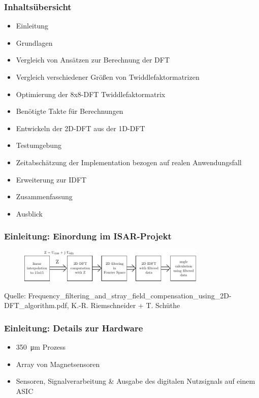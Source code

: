 \begin{frame}\frametitle{Inhaltsübersicht}
\begin{itemize}
 \item Einleitung
 \item Grundlagen
 \item Vergleich von Ansätzen zur Berechnung der DFT
 \item Vergleich verschiedener Größen von Twiddlefaktormatrizen
 \item Optimierung der 8x8-DFT Twiddlefaktormatrix
 \item Benötigte Takte für Berechnungen
 \item Entwickeln der 2D-DFT aus der 1D-DFT
 \item Testumgebung
 \item Zeitabschätzung der Implementation bezogen auf realen Anwendungsfall
 \item Erweiterung zur IDFT
 \item Zusammenfassung
 \item Ausblick
\end{itemize}
\end{frame}



\begin{frame}\frametitle{Einleitung: Einordung im ISAR-Projekt}
\vspace{1cm}
 \begin{figure}[ht!]
 \centering
 \includegraphics[width=0.8\textwidth]{img/AblaufFourier.pdf}
 \label{pic:AblaufFourier}
\end{figure}
\vspace{2cm}
\begin{center}
 \tiny{Quelle: Frequency\_filtering\_and\_stray\_field\_compensation\_using\_2D-DFT\_algorithm.pdf, K.-R. Riemschneider + T. Schüthe}
\end{center}
\end{frame}


\begin{frame}\frametitle{Einleitung: Details zur Hardware}
\begin{itemize}
 \item \SI{350}{\um} Prozess
 \item Array von Magnetsensoren
 \item Sensoren, Signalverarbeitung \& Ausgabe des digitalen Nutzsignals auf einem ASIC
\end{itemize}
\end{frame}




